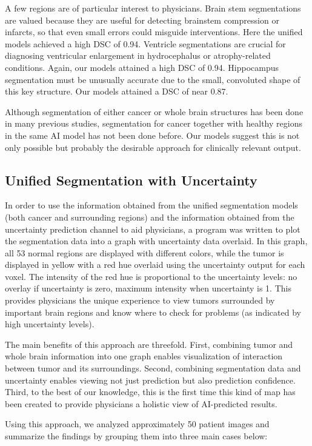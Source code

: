 \documentclass[11pt,letterpaper]{article}
\begin{document}
A few regions are of particular interest to physicians. Brain stem segmentations are valued because they are useful for detecting brainstem compression or infarcts, so that even small errors could misguide interventions. Here the unified models achieved a high DSC of 0.94. Ventricle segmentations are crucial for diagnosing ventricular enlargement in hydrocephalus or atrophy-related conditions. Again, our models attained a high DSC of 0.94. Hippocampus segmentation must be unusually accurate due to the small, convoluted shape of this key structure. Our models attained a DSC of near 0.87.

Although segmentation of either cancer or whole brain structures has been done in many previous studies, segmentation for cancer together with healthy regions in the same AI model has not been done before. Our models suggest this is not only possible but probably the desirable approach for clinically relevant output.

\subsection{Unified Segmentation with Uncertainty}
In order to use the information obtained from the unified segmentation models (both cancer and surrounding regions) and the information obtained from the uncertainty prediction channel to aid physicians, a program was written to plot the segmentation data into a graph with uncertainty data overlaid. In this graph, all 53 normal regions are displayed with different colors, while the tumor is displayed in yellow with a red hue overlaid using the uncertainty output for each voxel. The intensity of the red hue is proportional to the uncertainty levels: no overlay if uncertainty is zero, maximum intensity when uncertainty is 1. This provides physicians the unique experience to view tumors surrounded by important brain regions and know where to check for problems (as indicated by high uncertainty levels).

The main benefits of this approach are threefold. First, combining tumor and whole brain information into one graph enables visualization of interaction between tumor and its surroundings. Second, combining segmentation data and uncertainty enables viewing not just prediction but also prediction confidence. Third, to the best of our knowledge, this is the first time this kind of map has been created to provide physicians a holistic view of AI-predicted results.

Using this approach, we analyzed approximately 50 patient images and summarize the findings by grouping them into three main cases below:
\end{document}
